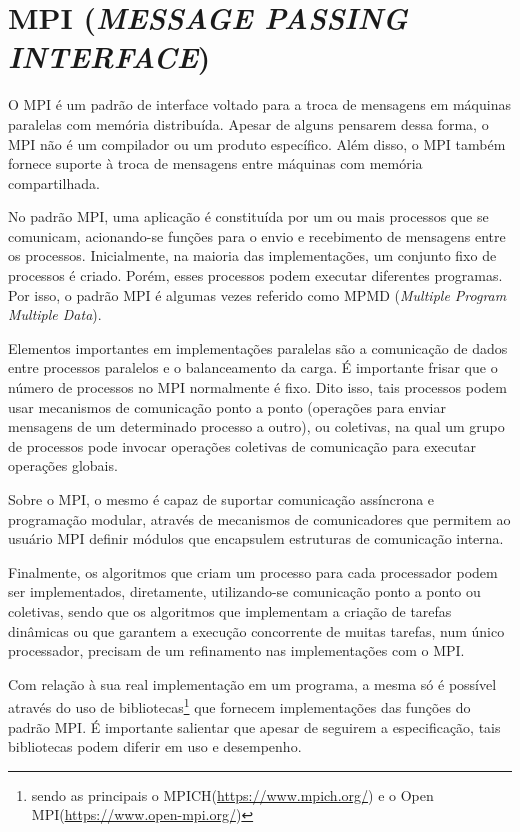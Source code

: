 \section{\normalsize MPI (\textit{MESSAGE PASSING INTERFACE})}\label{mpi}
	O  MPI é um padrão de interface voltado para a troca de mensagens em máquinas paralelas com memória distribuída. Apesar de alguns pensarem dessa forma, o MPI não é um compilador ou um produto específico. Além disso, o MPI também fornece suporte à troca de mensagens entre máquinas com memória compartilhada.
	
	No padrão MPI, uma aplicação é constituída por um ou mais processos que se comunicam, acionando-se funções para o envio e recebimento de mensagens entre os processos. Inicialmente, na maioria das implementações, um conjunto fixo de processos é criado. Porém, esses processos podem executar diferentes programas. Por isso, o padrão MPI é algumas vezes referido como MPMD (\textit{Multiple Program Multiple Data}).

	Elementos importantes em implementações paralelas são a comunicação de dados entre processos paralelos e o balanceamento da carga. É importante frisar que o número de processos no MPI normalmente é fixo. Dito isso, tais processos podem usar mecanismos de comunicação ponto a ponto (operações para enviar mensagens de um determinado processo a outro), ou coletivas, na qual um grupo de processos pode invocar operações coletivas de comunicação para executar operações globais. 

	Sobre o MPI, o mesmo é capaz de suportar comunicação assíncrona e programação modular, através de mecanismos de comunicadores que permitem ao usuário MPI definir módulos que encapsulem estruturas de comunicação interna.

	Finalmente, os algoritmos que criam um processo para cada processador podem ser implementados, diretamente, utilizando-se comunicação ponto a ponto ou coletivas, sendo que os algoritmos que implementam a criação de tarefas dinâmicas ou que garantem a execução concorrente de muitas tarefas, num único processador, precisam de um refinamento nas implementações com o MPI.
	
	Com relação à sua real implementação em um programa, a mesma só é possível através do uso de bibliotecas\footnote{sendo as principais o MPICH(\url{https://www.mpich.org/}) e o Open MPI(\url{https://www.open-mpi.org/})} que fornecem implementações das funções do padrão MPI. É importante salientar que apesar de seguirem a especificação, tais bibliotecas podem diferir em uso e desempenho.

